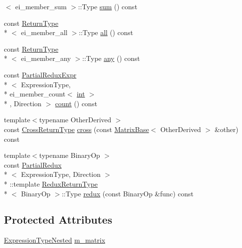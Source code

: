 \begin{DoxyCompactItemize}
$<$ ei\-\_\-member\-\_\-sum $>$\-::Type \hyperlink{class_partial_redux_a3211c6c498008a0739d37365de23a754}{sum} () const 
\item 
const \hyperlink{struct_partial_redux_1_1_return_type}{Return\-Type}\\*
$<$ ei\-\_\-member\-\_\-all $>$\-::Type \hyperlink{class_partial_redux_aa14975f1b822752ba07419b7f53bff49}{all} () const 
\item 
const \hyperlink{struct_partial_redux_1_1_return_type}{Return\-Type}\\*
$<$ ei\-\_\-member\-\_\-any $>$\-::Type \hyperlink{class_partial_redux_a4ca9642a3d85e1f975baa05abdfade9c}{any} () const 
\item 
const \hyperlink{class_partial_redux_expr}{Partial\-Redux\-Expr}\\*
$<$ Expression\-Type, \\*
ei\-\_\-member\-\_\-count$<$ \hyperlink{ioapi_8h_a787fa3cf048117ba7123753c1e74fcd6}{int} $>$\\*
, Direction $>$ \hyperlink{class_partial_redux_a0e8c63e82eed877cdf5f5ad065980035}{count} () const 
\item 
{\footnotesize template$<$typename Other\-Derived $>$ }\\const \hyperlink{class_partial_redux_a37567c70c25e1c7992976f173114fedb}{Cross\-Return\-Type} \hyperlink{class_partial_redux_af97a567b6eaff0f364bbb3def667ae6c}{cross} (const \hyperlink{class_matrix_base}{Matrix\-Base}$<$ Other\-Derived $>$ \&other) const 
\item 
{\footnotesize template$<$typename Binary\-Op $>$ }\\const \hyperlink{class_partial_redux}{Partial\-Redux}\\*
$<$ Expression\-Type, Direction $>$\\*
\-::template \hyperlink{struct_partial_redux_1_1_redux_return_type}{Redux\-Return\-Type}\\*
$<$ Binary\-Op $>$\-::Type \hyperlink{class_partial_redux_ace0d0b73ce202d1ad98369373ea292fe}{redux} (const Binary\-Op \&func) const 
\end{DoxyCompactItemize}
\subsection*{Protected Attributes}
\begin{DoxyCompactItemize}
\item 
\hyperlink{class_partial_redux_a0f17bbdfa61d2bd1e3d271dc82c595b8}{Expression\-Type\-Nested} \hyperlink{class_partial_redux_ad389576a862ac019c3bb1c979bcb6e12}{m\-\_\-matrix}
\end{DoxyCompactItemize}


